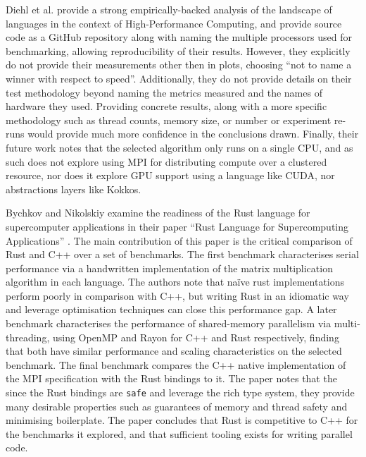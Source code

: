 Diehl et al. provide a strong empirically-backed analysis of the landscape of languages in the context of High-Performance Computing, and provide source code as a GitHub repository \cite{} along with naming the multiple processors used for benchmarking, allowing reproducibility of their results. However, they explicitly do not provide their measurements other then in plots, choosing ``not to name a winner with respect to speed''. Additionally, they do not provide details on their test methodology beyond naming the metrics measured and the names of hardware they used. Providing concrete results, along with a more specific methodology such as thread counts, memory size, or number or experiment re-runs would provide much more confidence in the conclusions drawn. %
Finally, their future work notes that the selected algorithm only runs on a single CPU, and as such does not explore using MPI for distributing compute over a clustered resource, nor does it explore GPU support using a language like CUDA, nor abstractions layers like Kokkos.

Bychkov and Nikolskiy examine the readiness of the Rust language for supercomputer applications in their paper ``Rust Language for Supercomputing Applications'' \cite{bychkovRustLanguageSupercomputing2021}. The main contribution of this paper is the critical comparison of Rust and C++ over a set of benchmarks. The first benchmark characterises serial performance via a handwritten implementation of the matrix multiplication algorithm in each language. The authors note that na\"ive rust implementations perform poorly in comparison with C++, but writing Rust in an idiomatic way and leverage optimisation techniques can close this performance gap. A later benchmark characterises the performance of shared-memory parallelism via multi-threading, using OpenMP and Rayon for C++ and Rust respectively, finding that both have similar performance and scaling characteristics on the selected benchmark. The final benchmark compares the C++ native implementation of the MPI specification with the Rust bindings to it. The paper notes that the since the Rust bindings are \texttt{safe} and leverage the rich type system, they provide many desirable properties such as guarantees of memory and thread safety and minimising boilerplate. The paper concludes that Rust is competitive to C++ for the benchmarks it explored, and that sufficient tooling exists for writing parallel code.

